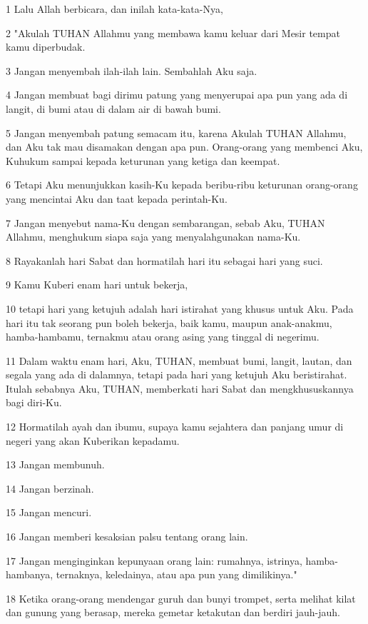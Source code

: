 \par 1 Lalu Allah berbicara, dan inilah kata-kata-Nya,
\par 2 "Akulah TUHAN Allahmu yang membawa kamu keluar dari Mesir tempat kamu diperbudak.
\par 3 Jangan menyembah ilah-ilah lain. Sembahlah Aku saja.
\par 4 Jangan membuat bagi dirimu patung yang menyerupai apa pun yang ada di langit, di bumi atau di dalam air di bawah bumi.
\par 5 Jangan menyembah patung semacam itu, karena Akulah TUHAN Allahmu, dan Aku tak mau disamakan dengan apa pun. Orang-orang yang membenci Aku, Kuhukum sampai kepada keturunan yang ketiga dan keempat.
\par 6 Tetapi Aku menunjukkan kasih-Ku kepada beribu-ribu keturunan orang-orang yang mencintai Aku dan taat kepada perintah-Ku.
\par 7 Jangan menyebut nama-Ku dengan sembarangan, sebab Aku, TUHAN Allahmu, menghukum siapa saja yang menyalahgunakan nama-Ku.
\par 8 Rayakanlah hari Sabat dan hormatilah hari itu sebagai hari yang suci.
\par 9 Kamu Kuberi enam hari untuk bekerja,
\par 10 tetapi hari yang ketujuh adalah hari istirahat yang khusus untuk Aku. Pada hari itu tak seorang pun boleh bekerja, baik kamu, maupun anak-anakmu, hamba-hambamu, ternakmu atau orang asing yang tinggal di negerimu.
\par 11 Dalam waktu enam hari, Aku, TUHAN, membuat bumi, langit, lautan, dan segala yang ada di dalamnya, tetapi pada hari yang ketujuh Aku beristirahat. Itulah sebabnya Aku, TUHAN, memberkati hari Sabat dan mengkhususkannya bagi diri-Ku.
\par 12 Hormatilah ayah dan ibumu, supaya kamu sejahtera dan panjang umur di negeri yang akan Kuberikan kepadamu.
\par 13 Jangan membunuh.
\par 14 Jangan berzinah.
\par 15 Jangan mencuri.
\par 16 Jangan memberi kesaksian palsu tentang orang lain.
\par 17 Jangan menginginkan kepunyaan orang lain: rumahnya, istrinya, hamba-hambanya, ternaknya, keledainya, atau apa pun yang dimilikinya."
\par 18 Ketika orang-orang mendengar guruh dan bunyi trompet, serta melihat kilat dan gunung yang berasap, mereka gemetar ketakutan dan berdiri jauh-jauh.

